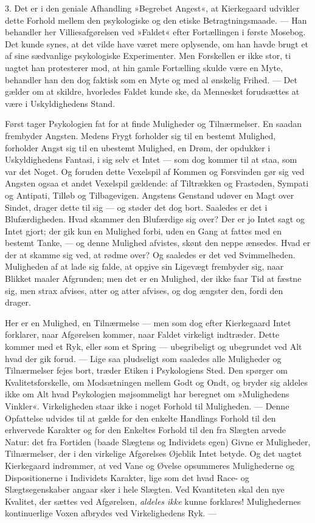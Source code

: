 \documentclass[12pt,a4paper,openany]{book}
\newcommand{\opage}[1]{\marginnote{\footnotesize\textit{[#1]}}}
\begin{document}
3. Det er i den geniale Afhandling »Begrebet
Angest«, at Kierkegaard udvikler dette Forhold mellem
den psykologiske og den etiske Betragtningsmaade. ---
Han behandler her Villiesafgørelsen ved »Faldet« efter
\opage{75}Fortællingen i første Mosebog. Det kunde synes, at det
vilde have været mere oplysende, om han havde brugt
et af sine sædvanlige psykologiske Experimenter. Men
Forskellen er ikke stor, ti uagtet han protesterer mod,
at hin gamle Fortælling skulde være en Myte, behandler
han den dog faktisk som en Myte og med al ønskelig
Frihed. --- Det gælder om at skildre, hvorledes Faldet
kunde ske, da Mennesket forudsættes at være i Uskyldighedens
Stand.

Først tager Psykologien fat for at finde Muligheder
og Tilnærmelser. En saadan frembyder Angsten. Medens
Frygt forholder sig til en bestemt Mulighed, forholder
Angst sig til en ubestemt Mulighed, en Drøm, der opdukker
i Uskyldighedens Fantasi, i sig selv et Intet ---
som dog kommer til at staa, som var det Noget. Og
foruden dette Vexelspil af Kommen og Forsvinden gør
sig ved Angsten ogsaa et andet Vexelspil gældende: af
Tiltrækken og Frastøden, Sympati og Antipati, Tilløb og
Tilbagevigen. Angstens Genstand udøver en Magt over
Sindet, drager dette til sig --- og støder det dog bort.
Saaledes er det i Blufærdigheden. Hvad skammer den
Blufærdige sig over? Der er jo Intet sagt og Intet
gjort; der gik kun en Mulighed forbi, uden en Gang at
fattes med en bestemt Tanke, --- og denne Mulighed afvistes,
skønt den neppe ænsedes. Hvad er der at skamme
sig ved, at rødme over? Og saaledes er det ved Svimmelheden.
Muligheden af at lade sig falde, at opgive sin
Ligevægt frembyder sig, naar Blikket maaler Afgrunden;
men det er en Mulighed, der ikke faar Tid at fæstne
sig, men strax afvises, atter og atter afvises, og dog
ængster den, fordi den drager.

Her er en Mulighed, en Tilnærmelse --- men som
dog efter Kierkegaard Intet forklarer, naar Afgørelsen
kommer, naar Faldet virkeligt indtræder. Dette kommer
\opage{76}med et Ryk, eller som et Spring --- ubegribeligt og ubegrundet
ved Alt hvad der gik forud. --- Lige saa pludseligt
som saaledes alle Muligheder og Tilnærmelser fejes
bort, træder Etiken i Psykologiens Sted. Den spørger
om Kvalitetsforskelle, om Modsætningen mellem Godt og
Ondt, og bryder sig aldeles ikke om Alt hvad Psykologien
møjsommeligt har beregnet om »Mulighedens Vinkler«.
Virkeligheden staar ikke i noget Forhold til Muligheden.
--- Denne Opfattelse udvides til at gælde for den
enkelte Handlings Forhold til den erhvervede Karakter
og for den Enkeltes Forhold til den fra Slægten arvede
Natur: det fra Fortiden (baade Slægtens og Individets
egen) Givne er Muligheder, Tilnærmelser, der i den
virkelige Afgørelses Øjeblik Intet betyde. Og det
uagtet Kierkegaard indrømmer, at ved Vane og Øvelse
opsummeres Mulighederne og Dispositionerne i Individets
Karakter, lige som det hvad Race- og Slægtsegenskaber
angaar sker i hele Slægten. Ved Kvantiteten skal den
nye Kvalitet, der sættes ved Afgørelsen, \textit{aldeles ikke}
kunne forklares! Mulighedernes kontinuerlige Voxen afbrydes
ved Virkelighedens Ryk. ---
\end{document}
